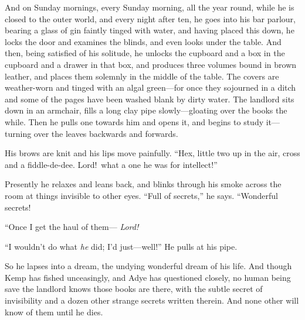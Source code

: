And on Sunday mornings, every Sunday morning, all the year round, while he is closed to the outer world, and every night after ten, he goes into his bar parlour, bearing a glass of gin faintly tinged with water, and having placed this down, he locks the door and examines the blinds, and even looks under the table. And then, being satisfied of his solitude, he unlocks the cupboard and a box in the cupboard and a drawer in that box, and produces three volumes bound in brown leather, and places them solemnly in the middle of the table. The covers are weather-worn and tinged with an algal green—for once they sojourned in a ditch and some of the pages have been washed blank by dirty water. The landlord sits down in an armchair, fills a long clay pipe slowly—gloating over the books the while. Then he pulls one towards him and opens it, and begins to study it—turning over the leaves backwards and forwards.

His brows are knit and his lips move painfully. “Hex, little two up in the air, cross and a fiddle-de-dee. Lord!\ what a one he was for intellect!”

Presently he relaxes and leans back, and blinks through his smoke across the room at things invisible to other eyes. “Full of secrets,” he says. “Wonderful secrets!

“Once I get the haul of them— \emph{Lord!}

“I wouldn’t do what \emph{he} did; I’d just—well!” He pulls at his pipe.

So he lapses into a dream, the undying wonderful dream of his life. And though Kemp has fished unceasingly, and Adye has questioned closely, no human being save the landlord knows those books are there, with the subtle secret of invisibility and a dozen other strange secrets written therein. And none other will know of them until he dies.